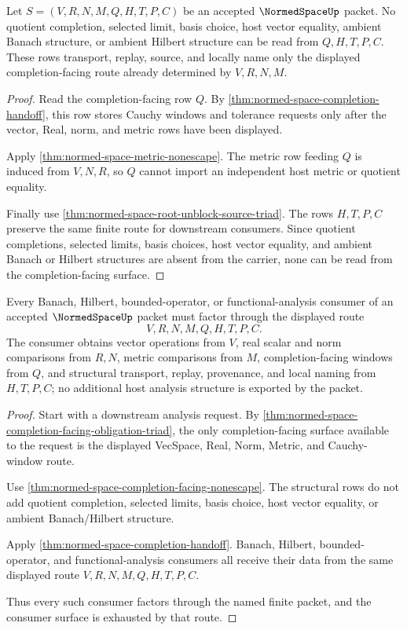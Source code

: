 \begin{theorem}
\label{thm:normed-space-completion-facing-nonescape}
Let $S=(V,R,N,M,Q,H,T,P,C)$ be an accepted $\NormedSpaceUp$ packet. No quotient completion, selected limit, basis choice, host vector equality, ambient Banach structure, or ambient Hilbert structure can be read from $Q,H,T,P,C$. These rows transport, replay, source, and locally name only the displayed completion-facing route already determined by $V,R,N,M$.
\end{theorem}
\begin{proof}
Read the completion-facing row $Q$. By \autoref{thm:normed-space-completion-handoff}, this row stores Cauchy windows and tolerance requests only after the vector, Real, norm, and metric rows have been displayed.

Apply \autoref{thm:normed-space-metric-nonescape}. The metric row feeding $Q$ is induced from $V,N,R$, so $Q$ cannot import an independent host metric or quotient equality.

Finally use \autoref{thm:normed-space-root-unblock-source-triad}. The rows $H,T,P,C$ preserve the same finite route for downstream consumers. Since quotient completions, selected limits, basis choices, host vector equality, and ambient Banach or Hilbert structures are absent from the carrier, none can be read from the completion-facing surface.
\end{proof}

\begin{theorem}
\label{thm:normed-space-consumer-exhaustion}
Every Banach, Hilbert, bounded-operator, or functional-analysis consumer of an accepted $\NormedSpaceUp$ packet must factor through the displayed route
$$
V,R,N,M,Q,H,T,P,C .
$$
The consumer obtains vector operations from $V$, real scalar and norm comparisons from $R,N$, metric comparisons from $M$, completion-facing windows from $Q$, and structural transport, replay, provenance, and local naming from $H,T,P,C$; no additional host analysis structure is exported by the packet.
\end{theorem}
\begin{proof}
Start with a downstream analysis request. By \autoref{thm:normed-space-completion-facing-obligation-triad}, the only completion-facing surface available to the request is the displayed VecSpace, Real, Norm, Metric, and Cauchy-window route.

Use \autoref{thm:normed-space-completion-facing-nonescape}. The structural rows do not add quotient completion, selected limits, basis choice, host vector equality, or ambient Banach/Hilbert structure.

Apply \autoref{thm:normed-space-completion-handoff}. Banach, Hilbert, bounded-operator, and functional-analysis consumers all receive their data from the same displayed route $V,R,N,M,Q,H,T,P,C$.

Thus every such consumer factors through the named finite packet, and the consumer surface is exhausted by that route.
\end{proof}


